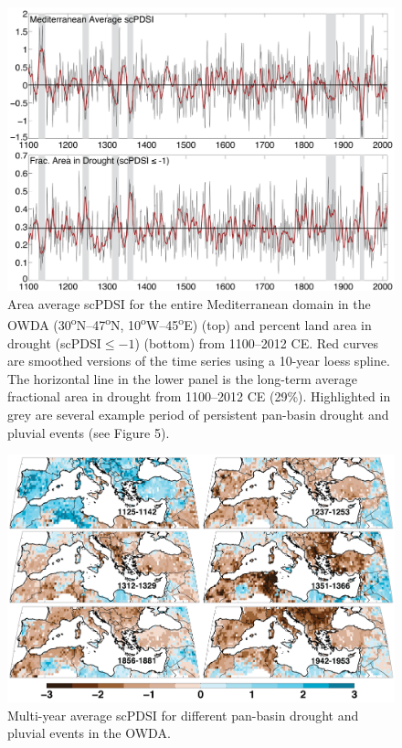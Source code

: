 \documentclass[draft,jgr]{AGUTeX}
\begin{document}
\begin{figure}
\center
\includegraphics[width=1.0\columnwidth]{fig_04_ave_area_pdsi_MED1.png}
\caption{Area average scPDSI for the entire Mediterranean domain in the OWDA (30\textsuperscript{o}N--47\textsuperscript{o}N, 10\textsuperscript{o}W--45\textsuperscript{o}E) (top) and percent land area in drought (scPDSI$\le-1$) (bottom) from 1100--2012 CE. Red curves are smoothed versions of the time series using a 10-year loess spline. The horizontal line in the lower panel is the long-term average fractional area in drought from 1100--2012 CE (29\%). Highlighted in grey are several example period of persistent pan-basin drought and pluvial events (see Figure 5).}\label{placeholder}
\end{figure}

\begin{figure}
\center
\includegraphics[width=1.0\columnwidth]{fig_05_drght_pluv_events.png}
\caption{Multi-year average scPDSI for different pan-basin drought and pluvial events in the OWDA.}\label{placeholder}
\end{figure}
\end{document}
